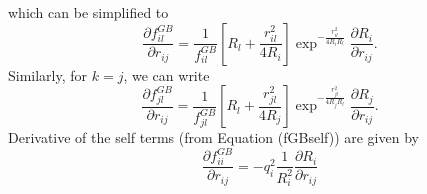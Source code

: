 \documentclass[12pt]{article}
\begin{document}
which can be simplified to
\begin{equation}
\label{eq:fklGBderv2}
\frac{\partial f_{il}^{GB}}{\partial r_{ij}} = \frac{1}{f_{il}^{GB}} \left[ R_{l} + \frac{r_{il}^{2}}{4R_{i}} \right] \exp^{-\frac{r_{il}^{2}}{4R_{i}R_{l}}}\frac{\partial R_{i}}{\partial r_{ij}}.
\end{equation}
Similarly, for $k=j$, we can write
\begin{equation}
\label{eq:fklGBderv3}
\frac{\partial f_{jl}^{GB}}{\partial r_{ij}} = \frac{1}{f_{jl}^{GB}} \left[ R_{l} + \frac{r_{jl}^{2}}{4R_{j}} \right] \exp^{-\frac{r_{jl}^{2}}{4R_{j}R_{l}}}\frac{\partial R_{j}}{\partial r_{ij}}.
\end{equation}
Derivative of the self terms (from Equation (fGBself)) are given by
\begin{equation}
\frac{\partial f_{ii}^{GB}}{\partial r_{ij}} = -q_{i}^{2}\frac{1}{R_{i}^{2}}\frac{\partial R_{i}}{\partial r_{ij}} 
\end{equation}
\end{document}
